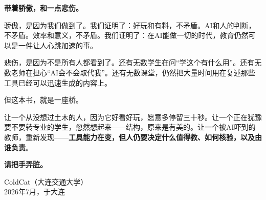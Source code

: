 \textbf{带着骄傲，和一点悲伤。}

骄傲，是因为我们做到了。我们证明了：好玩和有料，不矛盾。AI和人的判断，不矛盾。效率和意义，不矛盾。我们证明了：在AI能做一切的时代，教育仍然可以是一件让人心跳加速的事。

悲伤，是因为不是所有人都看到了。还有无数学生在问``学这个有什么用''。还有无数老师在担心``AI会不会取代我''。还有无数课堂，仍然把大量时间用在复述那些工具已经可以迅速生成的内容上。

但这本书，就是一座桥。

让一个从没想过土木的人，因为它好看好玩，愿意多停留三十秒。让一个正在犹豫要不要转专业的学生，忽然想起来——结构，原来是有美的。让一个被AI吓到的教师，重新发现——\textbf{工具能力在变，但人仍要决定什么值得教、如何核验，以及由谁负责}。

\begin{center}
{\LARGE\bfseries 请把手弄脏。}
\end{center}

\vspace{2cm}

\begin{flushright}
ColdCat（大连交通大学）\\
2026年7月，于大连
\end{flushright}
